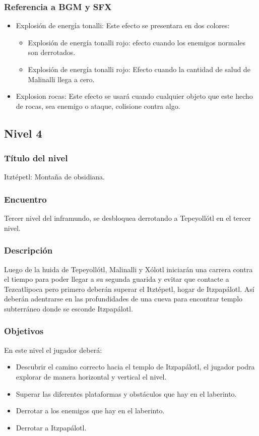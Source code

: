 \documentclass[11pt,letterpaper]{article}
\begin{document}
	\subsubsection{Referencia a BGM y SFX}
\begin{itemize}
	\item Explosión de energía tonalli: Este efecto se presentara en dos colores:
	\begin{itemize}
		\item Explosión de energía tonalli rojo: efecto cuando los enemigos normales son derrotados.
		\item Explosión de energía tonalli rojo: Efecto cuando la cantidad de salud de Malinalli llega a cero.
	\end{itemize}
	\item Explosion rocas: Este efecto se usará cuando cualquier objeto que este hecho de rocas, sea enemigo o ataque, colisione contra algo.
\end{itemize}

        \subsection{Nivel 4}
        \subsubsection{Título del nivel}
        Itztépetl: Montaña de obsidiana.
        \subsubsection{Encuentro}
Tercer nivel del inframundo, se desbloquea derrotando a Tepeyollótl en el tercer nivel.
        \subsubsection{Descripción}
        Luego de la huida de Tepeyollótl, Malinalli y Xólotl iniciarán una carrera contra el tiempo para poder llegar a su segunda guarida y evitar que contacte a Tezcatlipoca pero primero deberán superar el Itztépetl, hogar de Itzpapálotl. Así deberán adentrarse en las profundidades de una cueva para encontrar templo subterráneo donde se esconde Itzpapálotl. 
        \subsubsection{Objetivos}
En este nivel el jugador deberá:        
\begin{itemize}
        \item Descubrir el camino correcto hacia el templo de Itzpapálotl, el jugador podra explorar de manera horizontal y vertical el nivel.
        \item Superar las diferentes plataformas y obstáculos que hay en el laberinto. 
        \item Derrotar a los enemigos que hay en el laberinto.
        \item Derrotar a Itzpapálotl.
\end{itemize}
\end{document}
